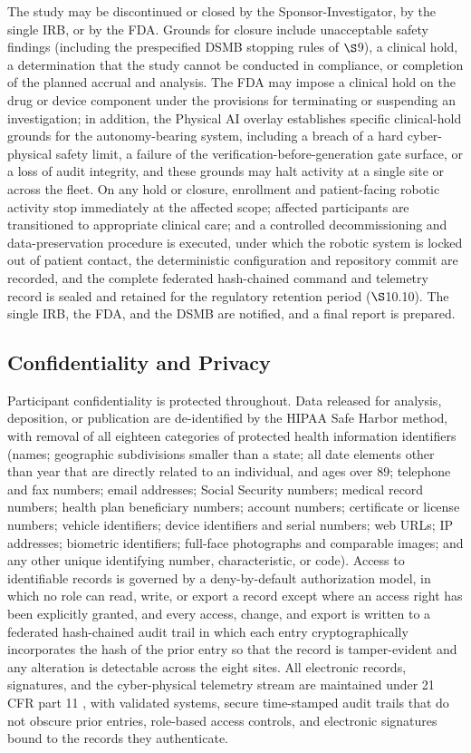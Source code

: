 The study may be discontinued or closed by the Sponsor-Investigator, by the single
IRB, or by the FDA. Grounds for closure include unacceptable safety findings
(including the prespecified DSMB stopping rules of $\S$9), a clinical hold, a
determination that the study cannot be conducted in compliance, or completion of the
planned accrual and analysis. The FDA may impose a clinical hold on the drug or
device component under the provisions for terminating or suspending an
investigation; in addition, the Physical AI overlay establishes specific
clinical-hold grounds for the autonomy-bearing system, including a breach of a hard
cyber-physical safety limit, a failure of the verification-before-generation gate
surface, or a loss of audit integrity, and these grounds may halt activity at a
single site or across the fleet. On any hold or closure, enrollment and
patient-facing robotic activity stop immediately at the affected scope; affected
participants are transitioned to appropriate clinical care; and a controlled
decommissioning and data-preservation procedure is executed, under which the robotic
system is locked out of patient contact, the deterministic configuration and
repository commit are recorded, and the complete federated hash-chained command and
telemetry record is sealed and retained for the regulatory retention period
($\S$10.10). The single IRB, the FDA, and the DSMB are notified, and a final report
is prepared.

\subsection{Confidentiality and Privacy}

Participant confidentiality is protected throughout. Data released for analysis,
deposition, or publication are de-identified by the HIPAA Safe Harbor method, with
removal of all eighteen categories of protected health information identifiers
(names; geographic subdivisions smaller than a state; all date elements other than
year that are directly related to an individual, and ages over 89; telephone and
fax numbers; email addresses; Social Security numbers; medical record numbers;
health plan beneficiary numbers; account numbers; certificate or license numbers;
vehicle identifiers; device identifiers and serial numbers; web URLs; IP addresses;
biometric identifiers; full-face photographs and comparable images; and any other
unique identifying number, characteristic, or code). Access to identifiable records
is governed by a deny-by-default authorization model, in which no role can read,
write, or export a record except where an access right has been explicitly granted,
and every access, change, and export is written to a federated hash-chained audit
trail in which each entry cryptographically incorporates the hash of the prior entry
so that the record is tamper-evident and any alteration is detectable across the
eight sites. All electronic records, signatures, and the cyber-physical telemetry
stream are maintained under 21 CFR part 11 \cite{ecfr2026part11}, with validated
systems, secure time-stamped audit trails that do not obscure prior entries,
role-based access controls, and electronic signatures bound to the records they
authenticate.

